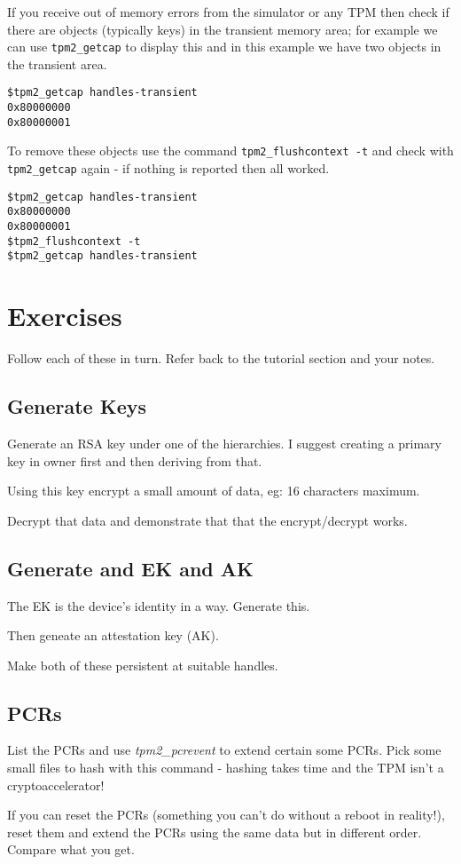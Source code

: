 \documentclass[11pt,a4paper]{article}
\begin{document}
If you receive out of memory errors from the simulator or any TPM then check if there are objects (typically keys) in the transient memory area; for example we can use \texttt{tpm2\_getcap} to display this and in this example we have two objects in the transient area.

\begin{verbatim}
$tpm2_getcap handles-transient
0x80000000
0x80000001
\end{verbatim}

To remove these objects use the command \texttt{tpm2\_flushcontext -t} and check with \texttt{tpm2\_getcap} again - if nothing is reported then all worked.

\begin{verbatim}
$tpm2_getcap handles-transient
0x80000000
0x80000001
$tpm2_flushcontext -t
$tpm2_getcap handles-transient
\end{verbatim}

\section{Exercises}
Follow each of these in turn. Refer back to the tutorial section and your notes.

\subsection{Generate Keys}
Generate an RSA key under one of the hierarchies. I suggest creating a primary key in owner first and then deriving from that.

Using this key encrypt a small amount of data, eg: 16 characters maximum.

Decrypt that data and demonstrate that that the encrypt/decrypt works.

\subsection{Generate and EK and AK}
The EK is the device's identity in a way. Generate this.

Then geneate an attestation key (AK).

Make both of these persistent at suitable handles.

\subsection{PCRs}
List the PCRs and use \textit{tpm2\_pcrevent} to extend certain some PCRs.  Pick some small files to hash with this command - hashing takes time and the TPM isn't a cryptoaccelerator!

If you can reset the PCRs (something you can't do without a reboot in reality!), reset them and extend the PCRs using the same data but in different order. Compare what you get.
\end{document}
